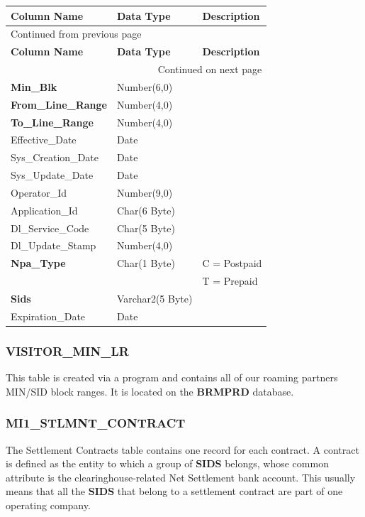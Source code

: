 \documentclass[12pt,twoside]{article}
\begin{document}
\begin{longtable}{l|l|l}
\hline
\textbf{Column Name} & \textbf{Data Type} & \textbf{Description}\\
\hline
\endfirsthead
\multicolumn{3}{l}{Continued from previous page} \\
\hline

\textbf{Column Name} & \textbf{Data Type} & \textbf{Description} \\

\hline
\endhead
\hline\multicolumn{3}{r}{Continued on next page} \\
\endfoot
\endlastfoot
\hline
\textbf{Min\_Blk} & Number(6,0) & \\
\textbf{From\_Line\_Range} & Number(4,0) & \\
\textbf{To\_Line\_Range} & Number(4,0) & \\
Effective\_Date & Date & \\
Sys\_Creation\_Date & Date & \\
Sys\_Update\_Date & Date & \\
Operator\_Id & Number(9,0) & \\
Application\_Id & Char(6 Byte) & \\
Dl\_Service\_Code & Char(5 Byte) & \\
Dl\_Update\_Stamp & Number(4,0) & \\
\textbf{Npa\_Type} & Char(1 Byte) & C = Postpaid\\
 &  & T = Prepaid\\
\textbf{Sids} & Varchar2(5 Byte) & \\
Expiration\_Date & Date & \\
\hline
\end{longtable}

\normalsize

\subsubsection{VISITOR\_MIN\_LR}
\label{sec:orgheadline100}
This table is created via a program and contains all of our
roaming partners MIN/SID block ranges. It is located on the
\textbf{BRMPRD} database.

\subsubsection{MI1\_STLMNT\_CONTRACT}
\label{sec:orgheadline101}
The Settlement Contracts table contains one record for each
contract. A contract is defined as the entity to which a group
of \textbf{SIDS} belongs, whose common attribute is the
clearinghouse-related Net Settlement bank account. This usually
means that all the \textbf{SIDS} that belong to a settlement contract
are part of one operating company.
\end{document}
